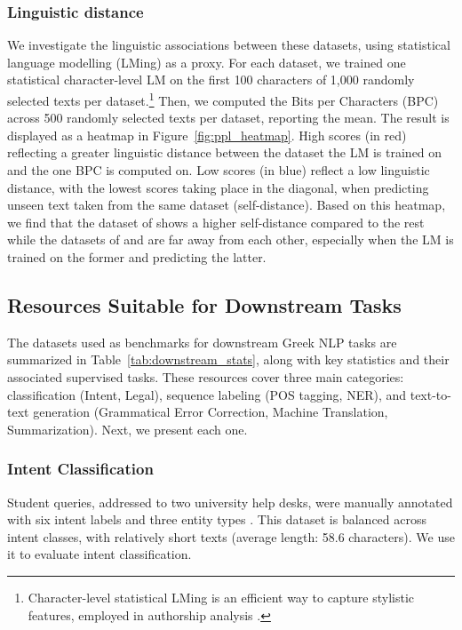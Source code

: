 \documentclass[sigconf,review,anonymous]{acmart}
\begin{document}
\subsubsection{Linguistic distance}
We investigate the linguistic associations between these datasets, using statistical language modelling (LMing) as a proxy. For each dataset, we trained one statistical character-level LM on the first 100 characters of 1,000 randomly selected texts per dataset.\footnote{Character-level statistical LMing is an efficient way to capture stylistic features, employed in authorship analysis \cite{pavlopoulos2023computational}.} Then, we computed the Bits per Characters (BPC) across 500 randomly selected texts per dataset, reporting the mean. The result is displayed as a heatmap in Figure~\ref{fig:ppl_heatmap}. High scores (in red) reflecting a greater linguistic distance between the dataset the LM is trained on and the one BPC is computed on. Low scores (in blue) reflect a low linguistic distance, with the lowest scores taking place in the diagonal, when predicting unseen text taken from the same dataset (self-distance). Based on this heatmap, we find that the dataset of \citet{prokopidis2020neural} shows a higher self-distance compared to the rest while the datasets of \citet{dritsa2022greek} and \citet{papantoniou2023automating} are far away from each other, especially when the LM is trained on the former and predicting the latter.  

\subsection{Resources Suitable for Downstream Tasks}
The datasets used as benchmarks for downstream Greek NLP tasks are summarized in Table~\ref{tab:downstream_stats}, along with key statistics and their associated supervised tasks. These resources cover three main categories: classification (Intent, Legal), sequence labeling (POS tagging, NER), and text-to-text generation (Grammatical Error Correction, Machine Translation, Summarization). Next, we present each one.

\subsubsection{Intent Classification} Student queries, addressed to two university help desks, were manually annotated with six intent labels and three entity types \cite{rizou2023efficient}. This dataset is balanced across intent classes, with relatively short texts (average length: 58.6 characters). We use it to evaluate intent classification.
\end{document}
